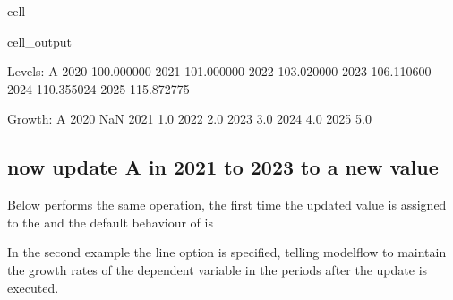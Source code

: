 \documentclass[letterpaper,10pt,english]{jupyterBook}
\begin{document}
\begin{sphinxuseclass}{cell}
\begin{sphinxVerbatimOutput}
\begin{sphinxuseclass}{cell_output}
\begin{sphinxVerbatim}[commandchars=\\\{\}]
Levels:
               A
2020  100.000000
2021  101.000000
2022  103.020000
2023  106.110600
2024  110.355024
2025  115.872775

Growth:
        A
2020  NaN
2021  1.0
2022  2.0
2023  3.0
2024  4.0
2025  5.0
\end{sphinxVerbatim}

\end{sphinxuseclass}\end{sphinxVerbatimOutput}

\end{sphinxuseclass}

\subsection{now update A in 2021 to 2023 to a new value}
\label{\detokenize{content/04_PythonEssentials/UpdateCommand:now-update-a-in-2021-to-2023-to-a-new-value}}
\sphinxAtStartPar
Below performs the same operation, the first time the updated value is assigned to the   and the default behaviour of  is 

\sphinxAtStartPar
In the second example the  line option is specified, telling modelflow to maintain the growth rates of the dependent variable in the periods after the update is executed.
\end{document}
